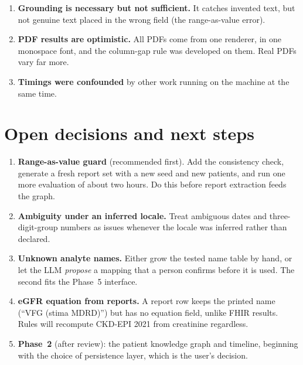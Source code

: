 \documentclass[11pt,a4paper]{article}
\begin{document}
\begin{enumerate}
\begin{itemize}
  \end{itemize}
  This sits uneasily with the ``never guess'' principle. An ambiguous date or number under an \emph{inferred} locale should become an issue, not a guess.
  \item \textbf{Grounding is necessary but not sufficient.} It catches invented text, but not genuine text placed in the wrong field (the range-as-value error).
  \item \textbf{PDF results are optimistic.} All PDFs come from one renderer, in one monospace font, and the column-gap rule was developed on them. Real PDFs vary far more.
  \item \textbf{Timings were confounded} by other work running on the machine at the same time.
\end{enumerate}

\section{Open decisions and next steps}
\begin{enumerate}
  \item \textbf{Range-as-value guard} (recommended first). Add the consistency check, generate a fresh report set with a new seed and new patients, and run one more evaluation of about two hours. Do this before report extraction feeds the graph.
  \item \textbf{Ambiguity under an inferred locale.} Treat ambiguous dates and three-digit-group numbers as issues whenever the locale was inferred rather than declared.
  \item \textbf{Unknown analyte names.} Either grow the tested name table by hand, or let the LLM \emph{propose} a mapping that a person confirms before it is used. The second fits the Phase~5 interface.
  \item \textbf{eGFR equation from reports.} A report row keeps the printed name (``VFG (stima MDRD)'') but has no equation field, unlike FHIR results. Rules will recompute CKD-EPI 2021 from creatinine regardless.
  \item \textbf{Phase~2} (after review): the patient knowledge graph and timeline, beginning with the choice of persistence layer, which is the user's decision.
\end{enumerate}

\appendix
\end{document}
